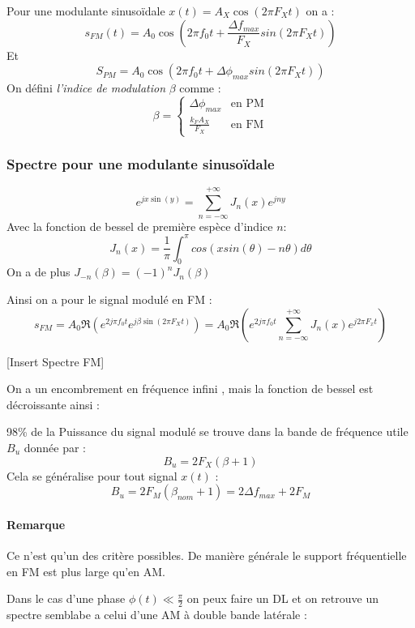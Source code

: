 \documentclass[main.tex]{subfiles}
\begin{document}
\begin{prop}
  Pour une modulante sinusoïdale $x(t) = A_X \cos(2\pi F_X t)$ on a :
  \[
    s_{FM}(t)=A_0 \cos\left(2\pi f_0 t +\frac{\Delta f_{max}}{F_X}sin(2\pi F_{X}t)\right)
  \]
  Et
  \[
    S_{PM} =A_0 \cos\left(2\pi f_0 t +\Delta \phi_{max}sin(2\pi F_{X}t)\right)
  \]
  On défini \emph{l'indice de modulation} $\beta$ comme :
  \[
    \beta =
    \begin{cases}
      \Delta \phi_{max} & \text{en PM}\\
      \frac{k_FA_X}{F_X} & \text{en FM}
    \end{cases}
  \]
\end{prop}

\subsubsection{Spectre pour une modulante sinusoïdale}

\begin{thm}
  \[
    e^{jx\sin(y)}=\sum_{n=-\infty}^{+\infty}J_n(x)e^{jny}
  \]
  Avec la fonction de bessel de première espèce d'indice $n$:
  \[
    J_n(x)=\frac{1}{\pi} \int_{0}^{\pi}cos(xsin(\theta)-n\theta)d\theta
  \]
  On a de plus $J_{-n}(\beta)= (-1)^nJ_n(\beta)$
\end{thm}

Ainsi on a pour le signal modulé en FM :
\[
  s_{FM} = A_0 \Re(e^{2j\pi f_0t}e^{j\beta\sin(2\pi F_Xt)}) = A_0 \Re \left(e^{2j\pi f_0 t} \sum_{n=-\infty}^{+\infty}J_n(x)e^{j2\pi F_x t}\right)
\]

[Insert Spectre FM]

On a un encombrement en fréquence infini , mais la fonction de bessel est décroissante ainsi :
\begin{prop}
  98\% de la Puissance du signal modulé se trouve dans la bande de fréquence utile $B_u$ donnée par :
  \[
    B_u = 2F_X(\beta+1)
  \]
  Cela se généralise pour tout signal $x(t)$ :
  \[
    B_u = 2F_M(\beta_{nom}+1) = 2\Delta f_{max}+2F_M
  \]
\end{prop}

\paragraph{Remarque} Ce n'est qu'un des critère possibles. De manière générale le support fréquentielle en FM est plus large qu'en AM.

Dans le cas d'une phase $\phi(t) \ll \frac{\pi}{2}$ on peux faire un DL et on retrouve un spectre semblabe a celui d'une AM à double bande latérale :
\end{document}
